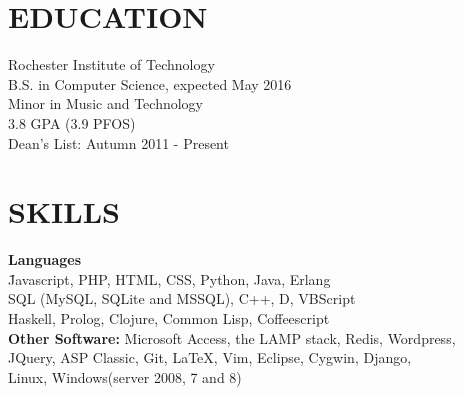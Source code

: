 \documentclass[line,margin]{res}
\begin{document}
\address{6000 Reynolds Dr, \#1482\\ Rochester, NY 14623}
\address{(646) 320-9143\\leeavital@gmail.com}


\begin{resume}
 
\section{EDUCATION}  Rochester Institute of Technology \\ 
                     B.S. in  Computer Science,  expected May 2016 \\
	                 Minor in Music and Technology\\
	                 3.8 GPA (3.9 PFOS) \\
	                 Dean's List: Autumn 2011 - Present
 \section{SKILLS} \vspace{-2ex}
	\begin{tabbing}
	  
	  
    {\bf Languages } \hspace{.5in} \= \\  
	\hspace{.2in}{\sl Very Experienced} \hspace{.5in}	\= Javascript, PHP, HTML, CSS, Python, Java, Erlang \\  
	\hspace{.2in}{\sl Proficient} \> SQL (MySQL, SQLite and MSSQL), C++, D, VBScript\\	
	\hspace{.2in}{\sl Less Experienced} \> Haskell, Prolog, Clojure, Common Lisp, Coffeescript\\
	  	
	{\bf Other Software:}           \> Microsoft Access, the LAMP stack, Redis, Wordpress,  \\ 
				                    \>	JQuery, ASP Classic, Git, LaTeX, Vim, Eclipse, Cygwin, Django, \\
				                    \>  Linux, Windows(server 2008, 7 and 8) \\
	

\end{tabbing}
\end{resume}
\end{document}
